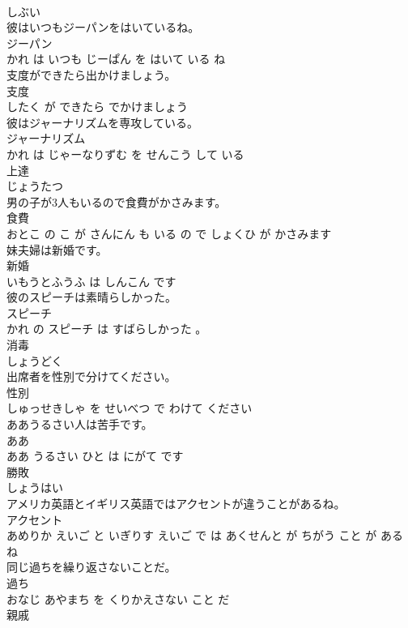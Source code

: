 \documentclass[8pt]{extreport}
\begin{document}
\begin{CJK}{UTF8}{min}
\\	しぶい		
\\	彼はいつもジーパンをはいているね。	
\\	ジーパン 
\\	かれ は いつも じーぱん を はいて いる ね			
\\	支度ができたら出かけましょう。	
\\	支度 
\\	したく が できたら でかけましょう			
\\	彼はジャーナリズムを専攻している。	
\\	ジャーナリズム 
\\	かれ は じゃーなりずむ を せんこう して いる			
\\	上達	
\\	じょうたつ		
\\	男の子が3人もいるので食費がかさみます。	
\\	食費 
\\	おとこ の こ が さんにん も いる の で しょくひ が かさみます			
\\	妹夫婦は新婚です。	
\\	新婚 
\\	いもうとふうふ は しんこん です			
\\	彼のスピーチは素晴らしかった。	
\\	スピーチ 
\\	かれ の スピーチ は すばらしかった 。			
\\	消毒	
\\	しょうどく		
\\	出席者を性別で分けてください。	
\\	性別 
\\	しゅっせきしゃ を せいべつ で わけて ください			
\\	ああうるさい人は苦手です。	
\\	ああ 
\\	ああ うるさい ひと は にがて です			
\\	勝敗	
\\	しょうはい		
\\	アメリカ英語とイギリス英語ではアクセントが違うことがあるね。	
\\	アクセント 
\\	あめりか えいご と いぎりす えいご で は あくせんと が ちがう こと が ある ね			
\\	同じ過ちを繰り返さないことだ。	
\\	過ち 
\\	おなじ あやまち を くりかえさない こと だ			
\\	親戚	

\end{CJK}
\end{document}
